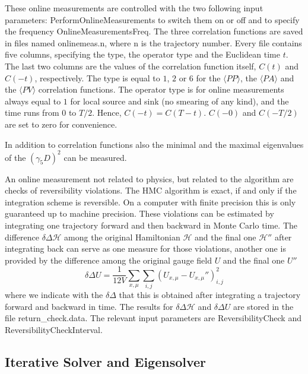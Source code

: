 These online measurements are controlled with the two following input
parameters: {\ttfamily PerformOnlineMeasurements} to switch them on or
off and to specify the frequency {\ttfamily OnlineMeasurementsFreq}. The three
correlation functions are saved in files named {\ttfamily
  onlinemeas.n}, where {\ttfamily n} is the trajectory number. Every
file contains five columns, specifying the type, the operator type and the
Euclidean time $t$. The last two columns are the values of the
correlation function itself, $C(t)$ and $C(-t)$, respectively. The
type is equal to $1$, $2$ or $6$ for the $\langle P P\rangle$, the
$\langle PA\rangle$ and the $\langle PV\rangle$ correlation
functions. The operator type is for online measurements always equal
to $1$ for local source and sink (no smearing of any kind), and the
time runs from $0$ to $T/2$. Hence, $C(-t)= C(T-t)$. $C(-0)$ and
$C(-T/2)$ are set to zero for convenience.

In addition to correlation functions also the minimal and the maximal
eigenvalues of the $(\gamma_5 D)^2$ can be measured.

An online measurement not related to physics, but related to the
algorithm are checks of reversibility violations. The HMC algorithm is
exact, if 
and only if the integration scheme is reversible. On a computer with
finite precision this is only guaranteed up to machine precision.
These violations can be estimated by integrating one trajectory
forward and then backward in Monte Carlo time. The difference
$\delta\Delta\mathcal{H}$ among
the original Hamiltonian $\mathcal{H}$ and the final one
$\mathcal{H}''$ after integrating back can serve as one measure for
those violations, another one is provided by the difference among the
original gauge field $U$ and the final one $U''$
\[
\delta\Delta U = \frac{1}{12V}
\sum_{x,\mu}\sum_{i,j} (U_{x,\mu}-U_{x,\mu}'')_{i,j}^2
\]
where we indicate with the $\delta\Delta$ that this is obtained after
integrating a trajectory forward and backward in time. The results for
$\delta\Delta \mathcal{H}$ and $\delta\Delta U$ are
stored in the file {\ttfamily return\_check.data}. The relevant input
parameters are {\ttfamily ReversibilityCheck} and {\ttfamily
  ReversibilityCheckInterval}.


\subsection{Iterative Solver and Eigensolver}


